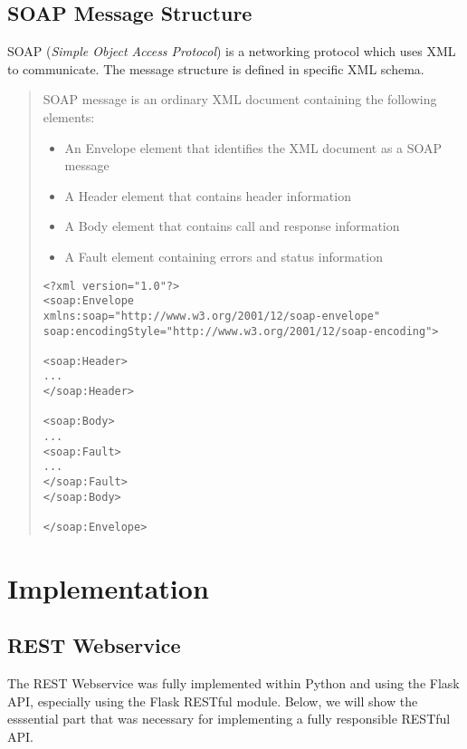 \documentclass[11pt, a4paper]{article}
\begin{document}
\subsection{SOAP Message Structure}

SOAP (\textit{Simple Object Access Protocol}) is a networking protocol which uses XML to communicate. The message structure is defined in specific XML schema.

\begin{quote}
SOAP message is an ordinary XML document containing the following elements:

\begin{itemize}
	\item An Envelope element that identifies the XML document as a SOAP message
	\item A Header element that contains header information
	\item A Body element that contains call and response information
	\item A Fault element containing errors and status information
\end{itemize}
	
\begin{lstlisting}
<?xml version="1.0"?>
<soap:Envelope
xmlns:soap="http://www.w3.org/2001/12/soap-envelope"
soap:encodingStyle="http://www.w3.org/2001/12/soap-encoding">
	
<soap:Header>
...
</soap:Header>
	
<soap:Body>
...
<soap:Fault>
...
</soap:Fault>
</soap:Body>
	
</soap:Envelope>
\end{lstlisting}
\vspace{10pt}
\cite{soap}

\end{quote}

\section{Implementation}

\subsection{REST Webservice}

The REST Webservice was fully implemented within Python and using the Flask API,
especially using the Flask RESTful module. Below, we will show the esssential
part that was necessary for implementing a fully responsible RESTful API.  
\end{document}
